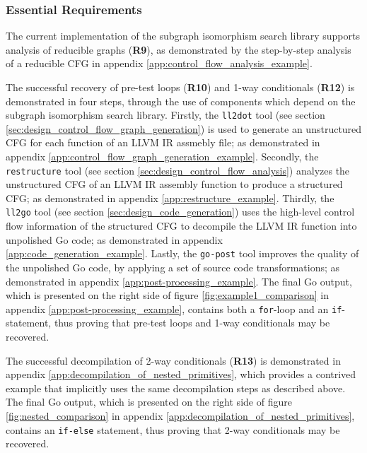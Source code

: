 
\subsubsection{Essential Requirements}
\label{sec:eval_control_flow_analysis_library_essential_requirements}


The current implementation of the subgraph isomorphism search library supports analysis of reducible graphs (\textbf{R9}), as demonstrated by the step-by-step analysis of a reducible CFG in appendix \ref{app:control_flow_analysis_example}.


The successful recovery of pre-test loops (\textbf{R10}) and 1-way conditionals (\textbf{R12}) is demonstrated in four steps, through the use of components which depend on the subgraph isomorphism search library. Firstly, the \texttt{ll2dot} tool (see section \ref{sec:design_control_flow_graph_generation}) is used to generate an unstructured CFG for each function of an LLVM IR assmebly file; as demonstrated in appendix \ref{app:control_flow_graph_generation_example}. Secondly, the \texttt{restructure} tool (see section \ref{sec:design_control_flow_analysis}) analyzes the unstructured CFG of an LLVM IR assembly function to produce a structured CFG; as demonstrated in appendix \ref{app:restructure_example}. Thirdly, the \texttt{ll2go} tool (see section \ref{sec:design_code_generation}) uses the high-level control flow information of the structured CFG to decompile the LLVM IR function into unpolished Go code; as demonstrated in appendix \ref{app:code_generation_example}. Lastly, the \texttt{go-post} tool improves the quality of the unpolished Go code, by applying a set of source code transformations; as demonstrated in appendix \ref{app:post-processing_example}. The final Go output, which is presented on the right side of figure \ref{fig:example1_comparison} in appendix \ref{app:post-processing_example}, contains both a \texttt{for}-loop and an \texttt{if}-statement, thus proving that pre-test loops and 1-way conditionals may be recovered.


The successful decompilation of 2-way conditionals (\textbf{R13}) is demonstrated in appendix \ref{app:decompilation_of_nested_primitives}, which provides a contrived example that implicitly uses the same decompilation steps as described above. The final Go output, which is presented on the right side of figure \ref{fig:nested_comparison} in appendix \ref{app:decompilation_of_nested_primitives}, contains an \texttt{if-else} statement, thus proving that 2-way conditionals may be recovered.

